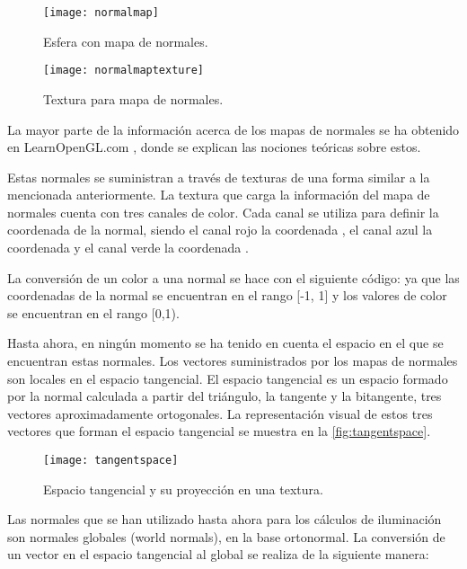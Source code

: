 		
\begin{figure}[H]
    \centering
	\texttt{[image: normalmap]}
	\caption{Esfera con mapa de normales.}
	\label{fig:normalmap}
\end{figure}

\begin{figure}[H]
    \centering
	\texttt{[image: normalmaptexture]}
	\caption{Textura para mapa de normales.}
	\label{fig:normalmaptexture}
\end{figure}


	
La mayor parte de la información acerca de los mapas de normales se ha obtenido en LearnOpenGL.com \cite{learnopengl}, donde se explican las nociones teóricas sobre estos.
	
Estas normales se suministran a través de texturas de una forma similar a la mencionada anteriormente. La textura que carga la información del mapa de normales cuenta con tres canales de color. Cada canal se utiliza para definir la coordenada de la normal, siendo el canal rojo la coordenada , el canal azul la coordenada  y el canal verde la coordenada .

La conversión de un color a una normal se hace con el siguiente código:  ya que las coordenadas de la normal se encuentran en el rango [-1, 1] y los valores de color se encuentran en el rango [0,1).
	
Hasta ahora, en ningún momento se ha tenido en cuenta el espacio en el que se encuentran estas normales. Los vectores suministrados por los mapas de normales son locales en el espacio tangencial. El espacio tangencial es un espacio formado por la normal calculada a partir del triángulo, la tangente y la bitangente, tres vectores aproximadamente ortogonales. La representación visual de estos tres vectores que forman el espacio tangencial se muestra en la \autoref{fig:tangentspace}.

\begin{figure}[H]
    \centering
	\texttt{[image: tangentspace]}
	\caption{Espacio tangencial y su proyección en una textura.}
	\label{fig:tangentspace}
\end{figure}
	
Las normales que se han utilizado hasta ahora para los cálculos de iluminación son normales globales (world normals), en la base ortonormal. La conversión de un vector en el espacio tangencial al global se realiza de la siguiente manera: 
	
